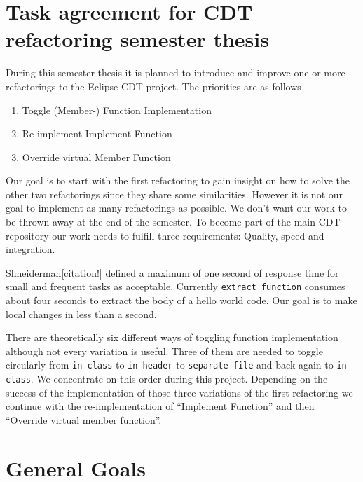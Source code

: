 \documentclass[a4paper,10pt]{scrreprt}
\begin{document}
\section*{Task agreement for CDT refactoring semester thesis}

During this semester thesis it is planned to introduce and improve one or more
refactorings to the Eclipse CDT project. The priorities are as follows

\begin{enumerate}
\item Toggle (Member-) Function Implementation
\item Re-implement Implement Function
\item Override virtual Member Function
\end{enumerate}

Our goal is to start with the first refactoring to gain insight on how to solve
the other two refactorings since they share some similarities. However it is not
our goal to implement as many refactorings as possible. We don't want our work
to be thrown away at the end of the semester. To become part of the main CDT
repository our work needs to fulfill three requirements: Quality, speed and
integration. 

Shneiderman[citation!] defined a maximum of one second of response time for
small and frequent tasks as acceptable. Currently \texttt{extract function}
consumes about four seconds to extract the body of a hello world code. Our goal
is to make local changes in less than a second.\newline

There are theoretically six different ways of toggling function implementation
although not every variation is useful. Three of them are needed to toggle
circularly from \texttt{in-class} to \texttt{in-header} to
\texttt{separate-file}  and back again to \texttt{in-class}. We concentrate on
this order during this project.\newline
Depending on the success of the implementation of those three variations of the
first refactoring we continue with the re-implementation of  ``Implement
Function'' and then ``Override virtual member function''.

\pagebreak

\section*{General Goals}
\end{document}
